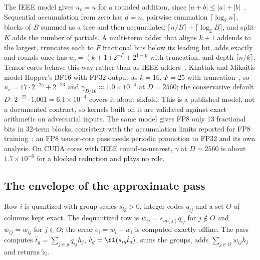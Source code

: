 The IEEE model gives $u_v=u$ for a rounded addition, since $|a+b|\le|a|+|b|$~\cite{higham2002}. Sequential accumulation from zero has $d=n$, pairwise summation $\lceil\log_2n\rceil$, blocks of $B$ summed as a tree and then accumulated $\lceil n/B\rceil+\lceil\log_2B\rceil$, and split-$K$ adds the number of partials. A multi-term adder that aligns $k+1$ addends to the largest, truncates each to $F$ fractional bits below its leading bit, adds exactly and rounds once has $u_v=(k+1)2^{-F}+2^{1-p}$ with truncation, and depth $\lceil n/k\rceil$. Tensor cores behave this way rather than as IEEE adders~\cite{fasi2021}. Khattak and Mikaitis model Hopper's BF16  with FP32 output as $k=16$, $F=25$ with truncation~\cite{khattak2026}, so $u_v=17\cdot2^{-25}+2^{-23}$ and $\gamma_{D/16}\approx1.0\times10^{-4}$ at $D=2560$; the conservative default $D\cdot2^{-22}\cdot1.001=6.1\times10^{-4}$ covers it about sixfold. This is a published model, not a documented contract, so kernels built on it are validated against exact arithmetic on adversarial inputs. The same model gives FP8  only 13 fractional bits in 32-term blocks, consistent with the accumulation limits reported for FP8 training~\cite{deepseekv3}; an FP8 tensor-core pass needs periodic promotion to FP32 and its own analysis. On CUDA cores with IEEE round-to-nearest, $\gamma$ at $D=2560$ is about $1.7\times10^{-6}$ for a blocked reduction and plays no role.

\subsection{The envelope of the approximate pass}\label{sec:envelope}
Row $i$ is quantized with group scales $s_{ig}>0$, integer codes $q_{ij}$ and a set $O$ of columns kept exact. The dequantized row is $\bar w_{ij}=s_{ig(j)}q_{ij}$ for $j\notin O$ and $\bar w_{ij}=w_{ij}$ for $j\in O$; the error $e_i=w_i-\bar w_i$ is computed exactly offline. The pass computes $\hat t_g=\sum_{j\in g}q_{ij}h_j$, $\hat v_g=\fl(s_{ig}\hat t_g)$, sums the groups, adds $\sum_{j\in O}w_{ij}h_j$ and returns $\tilde z_i$.

